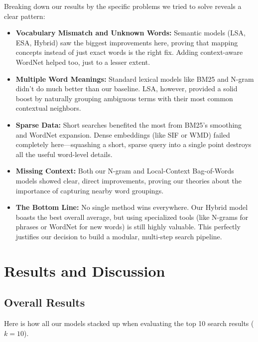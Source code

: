 \documentclass[runningheads]{llncs}
\begin{document}
Breaking down our results by the specific problems we tried to solve reveals a clear pattern:

\begin{itemize}
    \item \textbf{Vocabulary Mismatch and Unknown Words:} Semantic models (LSA, ESA, Hybrid) saw the biggest improvements here, proving that mapping concepts instead of just exact words is the right fix. Adding context-aware WordNet helped too, just to a lesser extent.
    \item \textbf{Multiple Word Meanings:} Standard lexical models like BM25 and N-gram didn't do much better than our baseline. LSA, however, provided a solid boost by naturally grouping ambiguous terms with their most common contextual neighbors.
    \item \textbf{Sparse Data:} Short searches benefited the most from BM25's smoothing and WordNet expansion. Dense embeddings (like SIF or WMD) failed completely here—squashing a short, sparse query into a single point destroys all the useful word-level details.
    \item \textbf{Missing Context:} Both our N-gram and Local-Context Bag-of-Words models showed clear, direct improvements, proving our theories about the importance of capturing nearby word groupings.
    \item \textbf{The Bottom Line:} No single method wins everywhere. Our Hybrid model boasts the best overall average, but using specialized tools (like N-grams for phrases or WordNet for new words) is still highly valuable. This perfectly justifies our decision to build a modular, multi-step search pipeline.
\end{itemize}

\section{Results and Discussion}
\subsection{Overall Results}
Here is how all our models stacked up when evaluating the top 10 search results ($k=10$).
\end{document}
